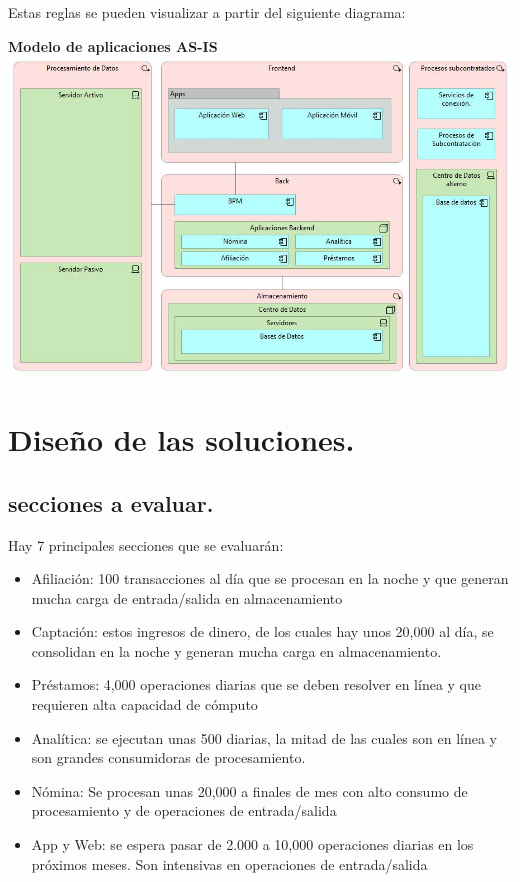\documentclass[a4paper]{article}
\begin{document}
Estas reglas se pueden visualizar a partir del siguiente diagrama:
\begin{center}
    \textbf{Modelo de aplicaciones AS-IS}
    \includegraphics[scale=0.56]{as-is.jpg}    
\end{center}

\section{Diseño de las soluciones.}

\subsection{secciones a evaluar.}
Hay 7 principales secciones que se evaluarán:
\begin{itemize}
    \item Afiliación: 100 transacciones al día que se procesan en la noche y que generan mucha carga de
    entrada/salida en almacenamiento
    \item Captación: estos ingresos de dinero, de los cuales hay unos 20,000 al día, se consolidan en la noche y
    generan mucha carga en almacenamiento.
    \item Préstamos: 4,000 operaciones diarias que se deben resolver en línea y que requieren alta capacidad de
    cómputo
    \item Analítica: se ejecutan unas 500 diarias, la mitad de las cuales son en línea y son grandes consumidoras de
    procesamiento.
    \item Nómina: Se procesan unas 20,000 a finales de mes con alto consumo de procesamiento y de operaciones
    de entrada/salida
    \item App y Web: se espera pasar de 2.000 a 10,000 operaciones diarias en los próximos meses. Son intensivas
    en operaciones de entrada/salida
\end{itemize}
\end{document}
